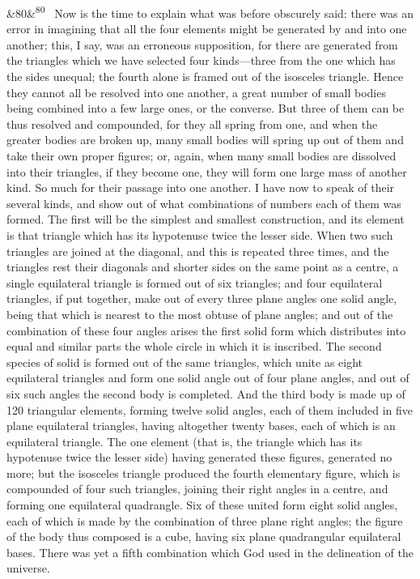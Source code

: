 \documentclass[12pt]{article}
\newcommand{\para}[1][]{\par\noindent\ifx&#1&\else\textsuperscript{\footnotesize #1}~\fi}
\begin{document}
\para[80] Now is the time to explain what was before obscurely said: there was an error in imagining that all the four elements might be generated by and into one another; this, I say, was an erroneous supposition, for there are generated from the triangles which we have selected four kinds---three from the one which has the sides unequal; the fourth alone is framed out of the isosceles triangle. Hence they cannot all be resolved into one another, a great number of small bodies being combined into a few large ones, or the converse. But three of them can be thus resolved and compounded, for they all spring from one, and when the greater bodies are broken up, many small bodies will spring up out of them and take their own proper figures; or, again, when many small bodies are dissolved into their triangles, if they become one, they will form one large mass of another kind. So much for their passage into one another. I have now to speak of their several kinds, and show out of what combinations of numbers each of them was formed. The first will be the simplest and smallest construction, and its element is that triangle which has its hypotenuse twice the lesser side. When two such triangles are joined at the diagonal, and this is repeated three times, and the triangles rest their diagonals and shorter sides on the same point as a centre, a single equilateral triangle is formed out of six triangles; and four equilateral triangles, if put together, make out of every three plane angles one solid angle, being that which is nearest to the most obtuse of plane angles; and out of the combination of these four angles arises the first solid form which distributes into equal and similar parts the whole circle in which it is inscribed. The second species of solid is formed out of the same triangles, which unite as eight equilateral triangles and form one solid angle out of four plane angles, and out of six such angles the second body is completed. And the third body is made up of 120 triangular elements, forming twelve solid angles, each of them included in five plane equilateral triangles, having altogether twenty bases, each of which is an equilateral triangle. The one element (that is, the triangle which has its hypotenuse twice the lesser side) having generated these figures, generated no more; but the isosceles triangle produced the fourth elementary figure, which is compounded of four such triangles, joining their right angles in a centre, and forming one equilateral quadrangle. Six of these united form eight solid angles, each of which is made by the combination of three plane right angles; the figure of the body thus composed is a cube, having six plane quadrangular equilateral bases. There was yet a fifth combination which God used in the delineation of the universe.
\end{document}
